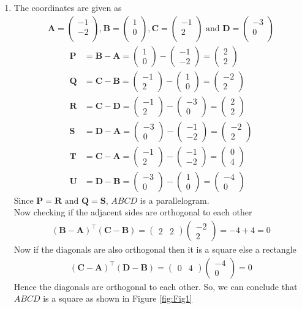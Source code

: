 \documentclass[12pt]{article}
\newcommand{\myvec}[1]{\ensuremath{\begin{pmatrix}#1\end{pmatrix}}}
\let\vec\mathbf
\begin{document}
\begin{enumerate}
\item The coordinates are given as
	\begin{align}
	\vec{A} = \myvec{
		-1\\
		-2\\
		},
	\vec{B} = \myvec{
		1\\
		0\\
		},
	\vec{C} = \myvec{
		-1\\
		2\\
		} \text{ and }
	\vec{D} = \myvec{
		-3\\
		0\\
		}
	\end{align}
	\begin{align}
		\vec{P} &= \vec{B} - \vec{A} = \myvec{1\\0} - \myvec{-1\\-2} = \myvec{2\\2}\\
		\vec{Q} &= \vec{C} - \vec{B} = \myvec{-1\\2} - \myvec{1\\0} = \myvec{-2\\2}\\
		\vec{R} &= \vec{C} - \vec{D} = \myvec{-1\\2} - \myvec{-3\\0} = \myvec{2\\2}\\
		\vec{S} &= \vec{D} - \vec{A} = \myvec{-3\\0} - \myvec{-1\\-2} = \myvec{-2\\2}\\
		\vec{T} &= \vec{C} - \vec{A} = \myvec{-1\\2} - \myvec{-1\\-2} = \myvec{0\\4}\\
		\vec{U} &= \vec{D} - \vec{B} = \myvec{-3\\0} - \myvec{1\\0} = \myvec{-4\\0}
	\end{align}
	Since $\vec{P} = \vec{R} \text{ and } \vec{Q} = \vec{S}$, $ABCD$ is a parallelogram.\\
	Now checking if the adjacent sides are orthogonal to each other
	\begin{align}
		(\vec{B}-\vec{A})^\top (\vec{C}-\vec{B}) = \myvec{2&2} \myvec{-2\\2} = -4+4 = 0
	\end{align}
	Now if the diagonals are also orthogonal then it is a square else a rectangle
	\begin{align}
		(\vec{C}-\vec{A})^\top (\vec{D}-\vec{B}) = \myvec{0&4} \myvec{-4\\0} = 0
	\end{align}
	Hence the diagonals are orthogonal to each other.
	So, we can conclude that $ABCD$ is a square as shown in Figure \ref{fig:Fig1}
 

\end{enumerate}
\end{document}
